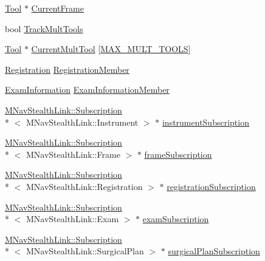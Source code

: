 \begin{DoxyCompactItemize}
\item 
\hyperlink{classmts_medtronic_stealthlink_1_1_tool}{Tool} $\ast$ \hyperlink{classmts_medtronic_stealthlink_a49aa0c7078f417253999302e19b67c8d}{Current\-Frame}
\item 
bool \hyperlink{classmts_medtronic_stealthlink_ac483f650c9ed1942194dbccca2c306d5}{Track\-Mult\-Tools}
\item 
\hyperlink{classmts_medtronic_stealthlink_1_1_tool}{Tool} $\ast$ \hyperlink{classmts_medtronic_stealthlink_a4e1f3377976ce273c64305dcfdbfe8c4}{Current\-Mult\-Tool} \mbox{[}\hyperlink{classmts_medtronic_stealthlink_a94ed5128120c48fc2582428ab8621998a2db20fb33f325a4d491d94d48829d57e}{M\-A\-X\-\_\-\-M\-U\-L\-T\-\_\-\-T\-O\-O\-L\-S}\mbox{]}
\item 
\hyperlink{classmts_medtronic_stealthlink_1_1_registration}{Registration} \hyperlink{classmts_medtronic_stealthlink_af3f0000b5a3e54cd33d8e133644c24eb}{Registration\-Member}
\item 
\hyperlink{classmts_medtronic_stealthlink_1_1_exam_information}{Exam\-Information} \hyperlink{classmts_medtronic_stealthlink_ab54f2ca3dd9279f65c616522695c43d3}{Exam\-Information\-Member}
\item 
\hyperlink{class_m_nav_stealth_link_1_1_subscription}{M\-Nav\-Stealth\-Link\-::\-Subscription}\\*
$<$ M\-Nav\-Stealth\-Link\-::\-Instrument $>$ $\ast$ \hyperlink{classmts_medtronic_stealthlink_a51d1dca84c09fff538413563f0bc3fd7}{instrument\-Subscription}
\item 
\hyperlink{class_m_nav_stealth_link_1_1_subscription}{M\-Nav\-Stealth\-Link\-::\-Subscription}\\*
$<$ M\-Nav\-Stealth\-Link\-::\-Frame $>$ $\ast$ \hyperlink{classmts_medtronic_stealthlink_a7498531aa89d4481e690d6a964f0de1e}{frame\-Subscription}
\item 
\hyperlink{class_m_nav_stealth_link_1_1_subscription}{M\-Nav\-Stealth\-Link\-::\-Subscription}\\*
$<$ M\-Nav\-Stealth\-Link\-::\-Registration $>$ $\ast$ \hyperlink{classmts_medtronic_stealthlink_a66aaac1496dacfa13dae52aec5b53be4}{registration\-Subscription}
\item 
\hyperlink{class_m_nav_stealth_link_1_1_subscription}{M\-Nav\-Stealth\-Link\-::\-Subscription}\\*
$<$ M\-Nav\-Stealth\-Link\-::\-Exam $>$ $\ast$ \hyperlink{classmts_medtronic_stealthlink_ae91000f8a40ee3468158a2b2bdd7ec5b}{exam\-Subscription}
\item 
\hyperlink{class_m_nav_stealth_link_1_1_subscription}{M\-Nav\-Stealth\-Link\-::\-Subscription}\\*
$<$ M\-Nav\-Stealth\-Link\-::\-Surgical\-Plan $>$ $\ast$ \hyperlink{classmts_medtronic_stealthlink_a341c6bd05bb61053f5b6ce6dde68f0b3}{surgical\-Plan\-Subscription}
\end{DoxyCompactItemize}
